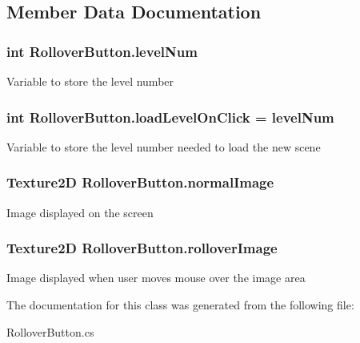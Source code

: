 \subsection{Member Data Documentation}
\hypertarget{class_rollover_button_adc09dd1173a6259348be1d3525811f09}{
\subsubsection[{level\-Num}]{\setlength{\rightskip}{0pt plus 5cm}int Rollover\-Button.\-level\-Num}}\label{class_rollover_button_adc09dd1173a6259348be1d3525811f09}
Variable to store the level number \hypertarget{class_rollover_button_a3672f844e873bedbc308a4dcd1038e77}{
\subsubsection[{load\-Level\-On\-Click}]{\setlength{\rightskip}{0pt plus 5cm}int Rollover\-Button.\-load\-Level\-On\-Click = {\bf level\-Num}}}\label{class_rollover_button_a3672f844e873bedbc308a4dcd1038e77}
Variable to store the level number needed to load the new scene \hypertarget{class_rollover_button_aa6ff64d2bb67d54b88494e63c3105dda}{
\subsubsection[{normal\-Image}]{\setlength{\rightskip}{0pt plus 5cm}Texture2\-D Rollover\-Button.\-normal\-Image}}\label{class_rollover_button_aa6ff64d2bb67d54b88494e63c3105dda}
Image displayed on the screen \hypertarget{class_rollover_button_a6cd6a9f837791f1d59bc12832612457e}{
\subsubsection[{rollover\-Image}]{\setlength{\rightskip}{0pt plus 5cm}Texture2\-D Rollover\-Button.\-rollover\-Image}}\label{class_rollover_button_a6cd6a9f837791f1d59bc12832612457e}
Image displayed when user moves mouse over the image area 

The documentation for this class was generated from the following file\-:\begin{DoxyCompactItemize}
\item 
Rollover\-Button.\-cs\end{DoxyCompactItemize}
